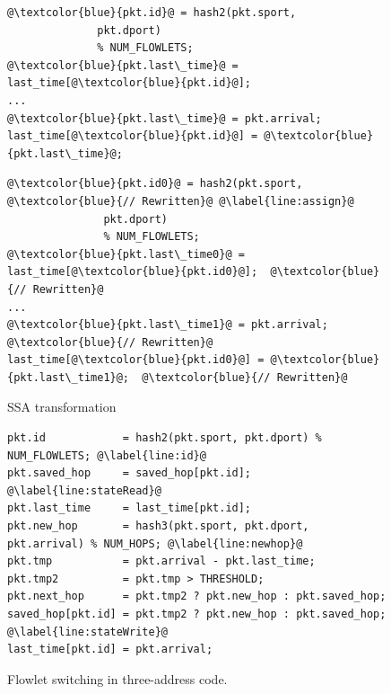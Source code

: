 \begin{figure}[!t]
  \begin{minipage}{0.43\textwidth}
  \begin{small}
  \begin{lstlisting}[style=customc]
@\textcolor{blue}{pkt.id}@ = hash2(pkt.sport,
              pkt.dport)
              % NUM_FLOWLETS;
@\textcolor{blue}{pkt.last\_time}@ = last_time[@\textcolor{blue}{pkt.id}@];
...
@\textcolor{blue}{pkt.last\_time}@ = pkt.arrival;
last_time[@\textcolor{blue}{pkt.id}@] = @\textcolor{blue}{pkt.last\_time}@;
  \end{lstlisting}
  \end{small}
  \end{minipage}
  \begin{minipage}{0.57\textwidth}
  \begin{small}
  \begin{lstlisting}[style=customc]
  @\textcolor{blue}{pkt.id0}@ = hash2(pkt.sport, @\textcolor{blue}{// Rewritten}@ @\label{line:assign}@
               pkt.dport)
               % NUM_FLOWLETS;
@\textcolor{blue}{pkt.last\_time0}@ = last_time[@\textcolor{blue}{pkt.id0}@];  @\textcolor{blue}{// Rewritten}@
...
@\textcolor{blue}{pkt.last\_time1}@ = pkt.arrival;  @\textcolor{blue}{// Rewritten}@
last_time[@\textcolor{blue}{pkt.id0}@] = @\textcolor{blue}{pkt.last\_time1}@;  @\textcolor{blue}{// Rewritten}@
  \end{lstlisting}
  \end{small}
  \end{minipage}
  \caption{SSA transformation\protect\footnotemark}
\label{fig:ssa}
\end{figure}

\begin{figure}[!t]
\begin{lstlisting}[style=customc]
pkt.id            = hash2(pkt.sport, pkt.dport) % NUM_FLOWLETS; @\label{line:id}@
pkt.saved_hop     = saved_hop[pkt.id]; @\label{line:stateRead}@
pkt.last_time     = last_time[pkt.id];
pkt.new_hop       = hash3(pkt.sport, pkt.dport, pkt.arrival) % NUM_HOPS; @\label{line:newhop}@
pkt.tmp           = pkt.arrival - pkt.last_time;
pkt.tmp2          = pkt.tmp > THRESHOLD;
pkt.next_hop      = pkt.tmp2 ? pkt.new_hop : pkt.saved_hop;
saved_hop[pkt.id] = pkt.tmp2 ? pkt.new_hop : pkt.saved_hop; @\label{line:stateWrite}@
last_time[pkt.id] = pkt.arrival;
\end{lstlisting}
\caption{Flowlet switching in three-address code.\protect\footnotemark}
\label{fig:three_address}
\end{figure}

